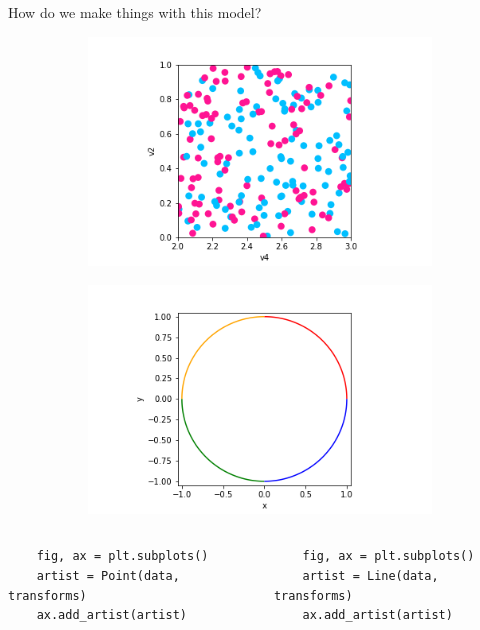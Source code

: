 \documentclass[xcolor={dvipsnames}, handout]{beamer}
\begin{document}
\begin{frame}[fragile]{How do we make things with this model?}
    \begin{figure}[H]
        \begin{subfigure}{0.49\textwidth}
            \includegraphics[width=\textwidth]{figures/code/scatter_0.png}
        \end{subfigure}
        \begin{subfigure}{0.49\textwidth}
            \includegraphics[width=\textwidth]{figures/code/line_1.png}
        \end{subfigure}
    \end{figure}
    \begin{columns}
    \begin{verbatim}
    fig, ax = plt.subplots()
    artist = Point(data, transforms)
    ax.add_artist(artist)
    \end{verbatim}
    \begin{verbatim}
    fig, ax = plt.subplots()
    artist = Line(data, transforms)
    ax.add_artist(artist)
    \end{verbatim}
    \end{columns}
\end{frame}
\end{document}
